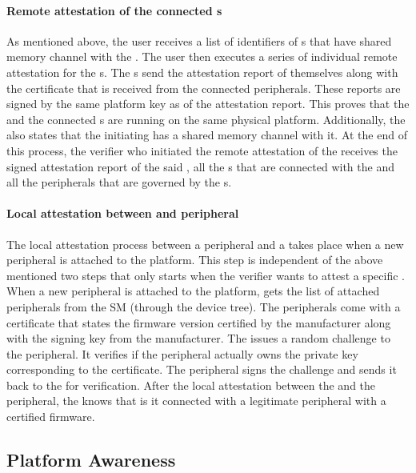 \paragraph{Remote attestation of the connected \ce{}s} As mentioned above, the user receives a list of identifiers of \ce{}s that have shared memory channel with the \app. The user then executes a series of individual remote attestation for the \ce{}s. The \ce{}s send the attestation report of themselves along with the certificate that is received from the connected peripherals. These reports are signed by the same platform key as of the \app attestation report. This proves that the \app and the connected \ce{}s are running on the same physical platform. Additionally, the \ce also states that the initiating \app has a shared memory channel with it. At the end of this process, the verifier who initiated the remote attestation of the \app receives the signed attestation report of the said \app, all the \ce{}s that are connected with the \app and all the peripherals that are governed by the \ce{}s.

\paragraph{Local attestation between \ce and peripheral} The local attestation process between a peripheral and a \ce takes place when a new peripheral is attached to the platform. This step is independent of the above mentioned two steps that only starts when the verifier wants to attest a specific \app. When a new peripheral is attached to the platform, \ce gets the list of attached peripherals from the SM (through the device tree). The peripherals come with a certificate that states the firmware version certified by the manufacturer along with the signing key from the manufacturer. The \ce issues a random challenge to the peripheral. It verifies if the peripheral actually owns the private key corresponding to the certificate. The peripheral signs the challenge and sends it back to the \ce for verification.
After the local attestation between the \ce and the peripheral, the \ce knows that is it connected with a legitimate peripheral with a certified firmware.
 


\subsection{Platform Awareness}
\label{sec:programmingModel:platformAwareness}


